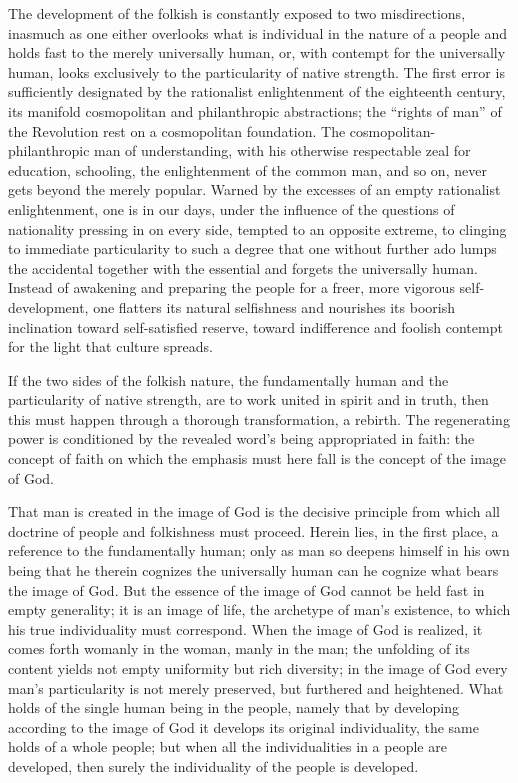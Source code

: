 \documentclass[12pt]{book}
\newcommand{\opage}[1]{\marginnote{\footnotesize\textit{[#1]}}}
\begin{document}
The development of the folkish is constantly exposed to two
misdirections, inasmuch as one either overlooks what is individual in
the nature of a people and holds fast to the merely universally human,
or, with contempt for the universally human, looks exclusively to the
particularity of native strength. The first error is sufficiently
designated by the rationalist enlightenment of the eighteenth century,
its manifold cosmopolitan and philanthropic abstractions; the
``rights of man'' of the Revolution rest on a cosmopolitan foundation.
The cosmopolitan-philanthropic man of understanding, with his otherwise
respectable zeal for education, schooling, the enlightenment of the
common man, and so on, never gets beyond the merely popular. Warned by
the excesses of an empty rationalist enlightenment, one is in our days,
under the influence of the questions of nationality pressing in on every
side, tempted to an opposite extreme, to clinging to immediate
particularity to such a degree that one without further ado lumps the
accidental together with the essential and forgets the universally
human. Instead of awakening and preparing the people for a freer, more
vigorous self-development, one flatters its natural selfishness and
nourishes its boorish inclination toward self-satisfied reserve, toward
\opage{123}\setcounter{footnote}{0}%
indifference and foolish contempt for the light that culture spreads.

If the two sides of the folkish nature, the fundamentally human and the
particularity of native strength, are to work united in spirit and in
truth, then this must happen through a thorough transformation, a
rebirth. The regenerating power is conditioned by the revealed word's
being appropriated in faith: the concept of faith on which the emphasis
must here fall is the concept of the image of God.

That man is created in the image of God is the decisive principle from
which all doctrine of people and folkishness must proceed. Herein lies,
in the first place, a reference to the fundamentally human; only as man
so deepens himself in his own being that he therein cognizes the
universally human can he cognize what bears the image of God. But the
essence of the image of God cannot be held fast in empty generality; it
is an image of life, the archetype of man's existence, to which his true
individuality must correspond. When the image of God is realized, it
comes forth womanly in the woman, manly in the man; the unfolding of its
content yields not empty uniformity but rich diversity; in the image of
God every man's particularity is not merely preserved, but furthered and
heightened. What holds of the single human being in the people, namely
that by developing according to the image of God it develops its
original
individuality, the same holds of a whole people; but when all
the individualities in a people are developed, then surely the
individuality of the people is developed.
\end{document}
